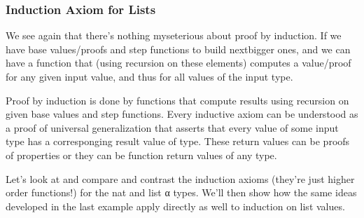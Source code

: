 \documentclass[letterpaper,10pt,english]{sphinxmanual}
\begin{document}
\begin{sphinxVerbatim}[commandchars=\\\{\}]
 

             \PYG{o}{[}\PYG{o}{]}  
   
       

  \PYG{o}{[}\PYG{o}{]}
\end{sphinxVerbatim}


\subsubsection{Induction Axiom for Lists}
\label{\detokenize{A_03_Recursive_Types:induction-axiom-for-lists}}
\sphinxAtStartPar
We see again that there’s nothing myseterious about proof by induction.
If we have base values/proofs and step functions to build next\sphinxhyphen{}bigger
ones, and we can have a function that (using recursion on these elements)
computes a value/proof for any given input value, and thus for all values
of the input type.

\sphinxAtStartPar
Proof by induction is done by functions that compute results using
recursion on given base values and step functions.  Every inductive
axiom can be understood as a proof of universal generalization that
asserts that every value of some input type has a corresponging result
value of type. These return values can be proofs of properties or they
can be function return values of any type.

\sphinxAtStartPar
Let’s look at and compare and contrast the induction axioms (they’re
just higher order functions!) for the nat and list α types. We’ll then
show how the same ideas developed in the last example apply directly
as well to induction on list values.
\end{document}
